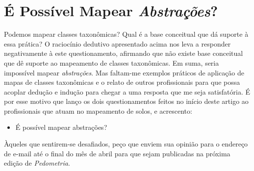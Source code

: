 \section{É Possível Mapear \textit{Abstrações}?}
\label{sec:abstraction}




Podemos mapear classes taxonômicas? Qual é a base conceitual que dá suporte à essa prática? O raciocínio dedutivo apresentado acima nos leva a responder negativamente à este questionamento, afirmando que não existe base conceitual que dê suporte ao mapeamento de classes taxonômicas. Em suma, seria impossível mapear \textit{abstrações}. Mas faltam-me exemplos práticos de aplicação de mapas de classes taxonômicas e o relato de outros profissionais para que possa acoplar dedução e indução para chegar a uma resposta que me seja satisfatória. É por esse motivo que lanço os dois questionamentos feitos no início deste artigo ao profissionais que atuam no mapeamento de solos, e acrescento:




\begin{itemize}
 \item É possível mapear abstrações?
\end{itemize}




Àqueles que sentirem-se desafiados, peço que enviem sua opinião para o endereço de e-mail  até o final do mês de abril para que sejam publicadas na próxima edição de \textit{Pedometria}.




